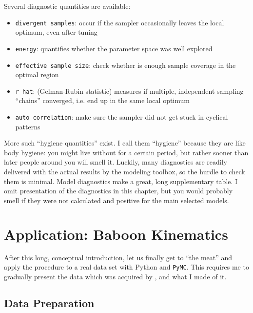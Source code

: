 Several diagnostic quantities are available:
\begin{itemize}
\item \texttt{divergent samples}: occur if the sampler occasionally leaves the local optimum, even after tuning
\item \texttt{energy}: quantifies whether the parameter space was well explored
\item \texttt{effective sample size}: check whether is enough sample coverage in the optimal region
\item \texttt{r hat}: (Gelman-Rubin statistic) measures if multiple, independent sampling ``chains'' converged, i.e. end up in the same local optimum
\item \texttt{auto correlation}: make sure the sampler did not get stuck in cyclical patterns
\end{itemize}

More such ``hygiene quantities'' exist.
I call them ``hygiene'' because they are like body hygiene: you might live without for a certain period, but rather sooner than later people around you will smell it.
Luckily, many diagnostics are readily delivered with the actual results by the modeling toolbox, so the hurdle to check them is minimal.
Model diagnostics make a great, long supplementary table.
I omit presentation of the diagnostics in this chapter, but you would probably smell if they were not calculated and positive for the main selected models.

\FloatBarrier
\clearpage
\section{Application: Baboon Kinematics}
\label{sec:orge39e02f}
After this long, conceptual introduction, let us finally get to ``the meat'' and apply the procedure to a real data set with Python and \texttt{PyMC}.
This requires me to gradually present the data which was acquired by \citet{Druelle2021}, and what I made of it.

\subsection{Data Preparation}
\label{sec:orgeaaa58c}

